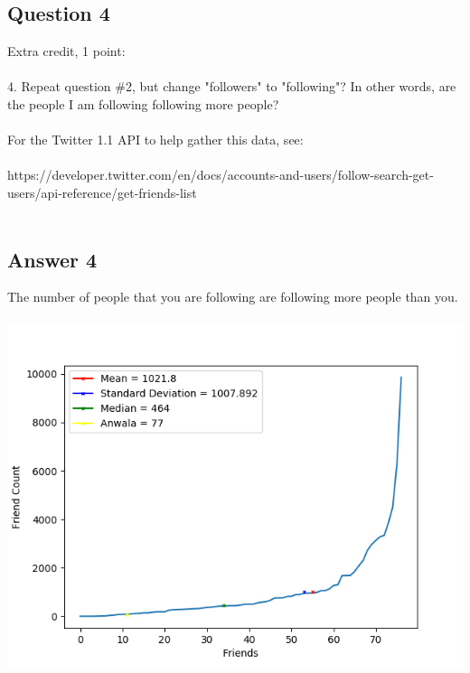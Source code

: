 \documentclass[10pt,letterpaper]{article}
\begin{document}
\subsection{Question 4}
Extra credit, 1 point:\\
\\
4.  Repeat question \#2, but change "followers" to "following"?  In
other words, are the people I am following following more people?\\
\\
For the Twitter 1.1 API to help gather this data, see:\\
\\
https://developer.twitter.com/en/docs/accounts-and-users/follow-search-get-users/api-reference/get-friends-list\\
\\
\subsection{Answer 4}
The number of people that you are following are following more people than you. \\
\\
\includegraphics[scale=1]{Question4.png}
\pagebreak
\end{document}
